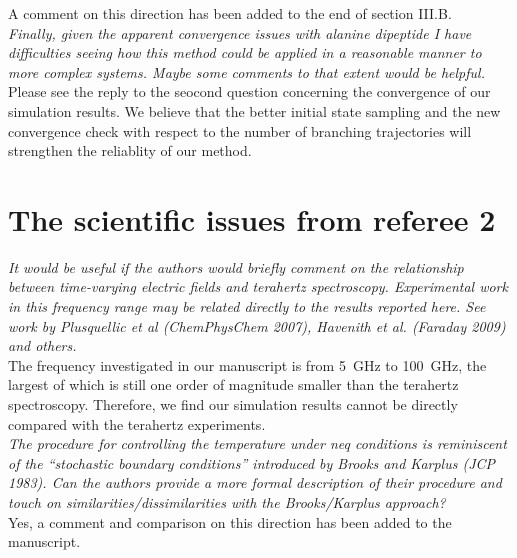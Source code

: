 \documentclass[]{revtex4-1}
\begin{document}
A comment on this direction has been added to the end of section III.B.
\\

\emph{Finally, given the apparent convergence issues with alanine
  dipeptide I have difficulties seeing how this method could be
  applied in a reasonable manner to more complex systems. Maybe some
  comments to that extent would be helpful.  }\\


Please see the reply to the seocond question concerning the convergence
of our simulation results. We believe that the better initial
state sampling and the new convergence check with respect to the
number of branching trajectories will strengthen the reliablity
of our method.






\section*{The scientific issues from referee 2}

\emph{
It would be useful if the authors would briefly comment on the
relationship between time-varying electric fields and terahertz
spectroscopy. Experimental work in this frequency range may be related
directly to the results reported here. See work by Plusquellic et al
(ChemPhysChem 2007), Havenith et al. (Faraday 2009) and others.
}\\

The frequency investigated in our manuscript is from 5~GHz to 100~GHz,
the largest of which is still one order of magnitude smaller than the
terahertz spectroscopy. Therefore, we find our simulation results
cannot be directly compared with the terahertz experiments.\\

\emph{ The procedure for controlling the temperature under neq
  conditions is reminiscent of the ``stochastic boundary conditions''
  introduced by Brooks and Karplus (JCP 1983). Can the authors provide
  a more formal description of their procedure and touch on
  similarities/dissimilarities with the Brooks/Karplus approach?  }\\

Yes, a comment and comparison on this direction has been added to the
manuscript.\\
\end{document}
